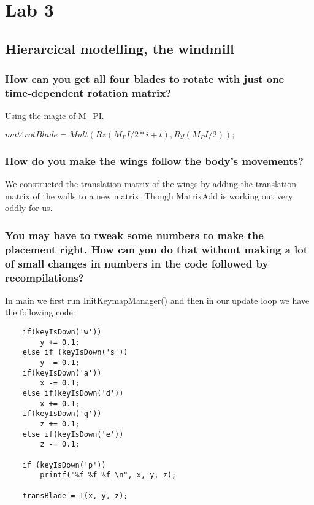 \documentclass[a4paper,12pt]{article}
\begin{document}
\section{Lab 3}
\subsection{Hierarcical modelling, the windmill}
\subsubsection{How can you get all four blades to rotate with just one time-dependent rotation matrix?}
Using the magic of M\_PI.

$
		mat4 rotBlade = Mult(Rz(M_PI / 2 * i + t), Ry(M_PI / 2));
$

\subsubsection{How do you make the wings follow the body's movements?}
We constructed the translation matrix of the wings by adding the translation matrix of the walls to a new matrix. Though MatrixAdd is working out very oddly for us.

\subsubsection{You may have to tweak some numbers to make the placement right. How can you do that without making a lot of small changes in numbers in the code followed by recompilations?}

In main we first run InitKeymapManager() and then in our update loop we have the following code:

\begin{lstlisting}
	if(keyIsDown('w'))
		y += 0.1;
	else if (keyIsDown('s'))
		y -= 0.1;
	if(keyIsDown('a'))
		x -= 0.1;
	else if(keyIsDown('d'))
		x += 0.1;
	if(keyIsDown('q'))
		z += 0.1;
	else if(keyIsDown('e'))
		z -= 0.1;

	if (keyIsDown('p'))
		printf("%f %f %f \n", x, y, z);

	transBlade = T(x, y, z);
\end{lstlisting}
\end{document}
